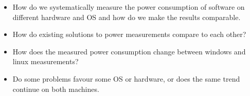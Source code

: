 \begin{itemize}
    \item How do we systematically measure the power consumption of software on different hardware and OS and how do we make the results comparable.
    \item How do existing solutions to power measurements compare to each other?
    \item How does the measured power consumption change between windows and linux measurements?
    \item Do some problems favour some OS or hardware, or does the same trend continue on both machines.
\end{itemize}
